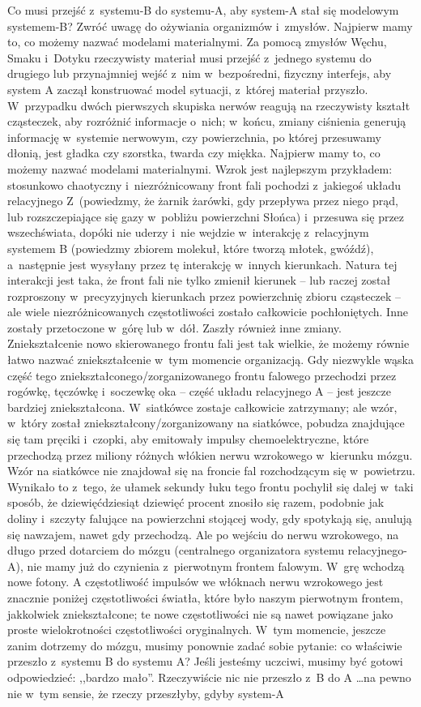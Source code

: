 \documentclass[oneside,polish,11pt,rmheadings]{mwbk}
\begin{document}
Co musi przejść z~systemu-B do systemu-A, aby system-A stał się modelowym systemem-B? Zwróć uwagę do ożywiania organizmów i~zmysłów. Najpierw mamy to, co możemy nazwać modelami materialnymi. Za pomocą zmysłów Węchu, Smaku i~Dotyku rzeczywisty materiał musi przejść z~jednego systemu do drugiego lub przynajmniej wejść z~nim w~bezpośredni, fizyczny interfejs, aby system A zaczął konstruować model sytuacji, z~której materiał przyszło. W~przypadku dwóch pierwszych skupiska nerwów reagują na rzeczywisty kształt cząsteczek, aby rozróżnić informacje o~nich; w~końcu, zmiany ciśnienia generują informację w~systemie nerwowym, czy powierzchnia, po której przesuwamy dłonią, jest gładka czy szorstka, twarda czy miękka. Najpierw mamy to, co możemy nazwać modelami materialnymi. Wzrok jest najlepszym przykładem: stosunkowo chaotyczny i~niezróżnicowany front fali pochodzi z~jakiegoś układu relacyjnego Z~(powiedzmy, że żarnik żarówki, gdy przepływa przez niego prąd, lub rozszczepiające się gazy w~pobliżu powierzchni Słońca) i~przesuwa się przez wszechświata, dopóki nie uderzy i~nie wejdzie w~interakcję z~relacyjnym systemem B (powiedzmy zbiorem molekuł, które tworzą młotek, gwóźdź), a~następnie jest wysyłany przez tę interakcję w~innych kierunkach. Natura tej interakcji jest taka, że front fali nie tylko zmienił kierunek -- lub raczej został rozproszony w~precyzyjnych kierunkach przez powierzchnię zbioru cząsteczek -- ale wiele niezróżnicowanych częstotliwości zostało całkowicie pochłoniętych. Inne zostały przetoczone w~górę lub w~dół. Zaszły również inne zmiany. Zniekształcenie nowo skierowanego frontu fali jest tak wielkie, że możemy równie łatwo nazwać zniekształcenie w~tym momencie organizacją. Gdy niezwykle wąska część tego zniekształconego/zorganizowanego frontu falowego przechodzi przez rogówkę, tęczówkę i~soczewkę oka -- część układu relacyjnego A -- jest jeszcze bardziej zniekształcona. W~siatkówce zostaje całkowicie zatrzymany; ale wzór, w~który został zniekształcony/zorganizowany na siatkówce, pobudza znajdujące się tam pręciki i~czopki, aby emitowały impulsy chemoelektryczne, które przechodzą przez miliony różnych włókien nerwu wzrokowego w~kierunku mózgu. Wzór na siatkówce nie znajdował się na froncie fal rozchodzącym się w~powietrzu. Wynikało to z~tego, że ułamek sekundy łuku tego frontu pochylił się dalej w~taki sposób, że dziewięćdziesiąt dziewięć procent znosiło się razem, podobnie jak doliny i~szczyty falujące na powierzchni stojącej wody, gdy spotykają się, anulują się nawzajem, nawet gdy przechodzą. Ale po wejściu do nerwu wzrokowego, na długo przed dotarciem do mózgu (centralnego organizatora systemu relacyjnego-A), nie mamy już do czynienia z~pierwotnym frontem falowym. W~grę wchodzą nowe fotony. A częstotliwość impulsów we włóknach nerwu wzrokowego jest znacznie poniżej częstotliwości światła, które było naszym pierwotnym frontem, jakkolwiek zniekształcone; te nowe częstotliwości nie są nawet powiązane jako proste wielokrotności częstotliwości oryginalnych. W~tym momencie, jeszcze zanim dotrzemy do mózgu, musimy ponownie zadać sobie pytanie: co właściwie przeszło z~systemu B do systemu A? Jeśli jesteśmy uczciwi, musimy być gotowi odpowiedzieć: ,,bardzo mało''. Rzeczywiście nic nie przeszło z~B do A \ldots  na pewno nie w~tym sensie, że rzeczy przeszłyby, gdyby system-A 
\end{document}
